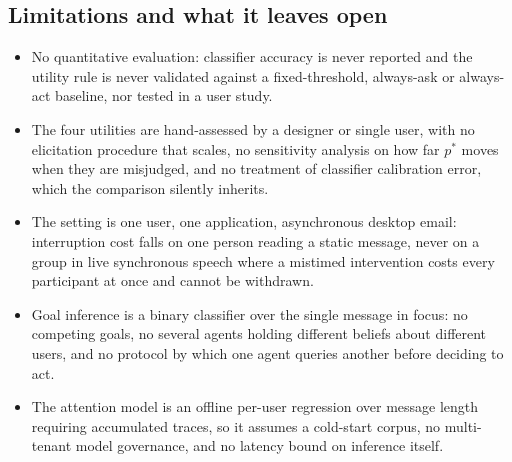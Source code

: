 \subsection{Limitations and what it leaves open}
\begin{itemize}[leftmargin=*,itemsep=1pt,topsep=2pt]
  \item No quantitative evaluation: classifier accuracy is never reported and the utility rule is never validated against a fixed-threshold, always-ask or always-act baseline, nor tested in a user study.
  \item The four utilities are hand-assessed by a designer or single user, with no elicitation procedure that scales, no sensitivity analysis on how far $p^{*}$ moves when they are misjudged, and no treatment of classifier calibration error, which the comparison silently inherits.
  \item The setting is one user, one application, asynchronous desktop email: interruption cost falls on one person reading a static message, never on a group in live synchronous speech where a mistimed intervention costs every participant at once and cannot be withdrawn.
  \item Goal inference is a binary classifier over the single message in focus: no competing goals, no several agents holding different beliefs about different users, and no protocol by which one agent queries another before deciding to act.
  \item The attention model is an offline per-user regression over message length requiring accumulated traces, so it assumes a cold-start corpus, no multi-tenant model governance, and no latency bound on inference itself.
\end{itemize}
